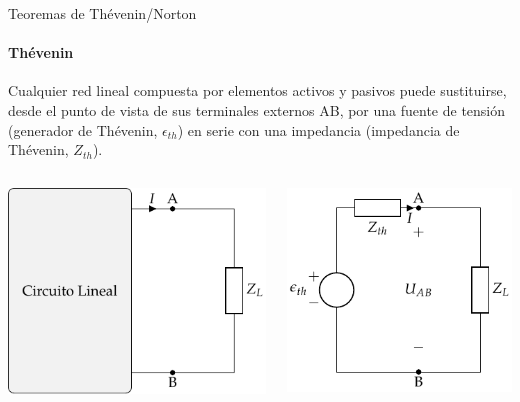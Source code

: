 \documentclass[aspectratio=169, usenames,svgnames,dvipsnames]{beamer}
\begin{document}
\begin{frame}[label={sec:org61b199d}]{Teoremas de Thévenin/Norton}
\framesubtitle{Thévenin}

Cualquier \alert{red lineal} compuesta por elementos activos y pasivos puede sustituirse, desde el punto de vista de sus terminales externos AB, por una \alert{fuente de tensión} (generador de Thévenin, \(\epsilon_{th}\)) en \alert{serie} con una impedancia (impedancia de Thévenin, \(Z_{th}\)).

\begin{columns}
\begin{column}{0.5\columnwidth}
\begin{center}
\includegraphics[height=0.6\textheight]{../figs/CircuitoLineal_ZL.pdf}
\end{center}
\end{column}

\begin{column}{0.5\columnwidth}
\begin{center}
\includegraphics[height=0.6\textheight]{../figs/EquivalenteThevenin.pdf}
\end{center}
\end{column}
\end{columns}
\end{frame}
\end{document}

